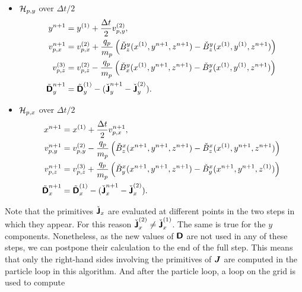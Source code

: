 \documentclass[11pt]{article}
\begin{document}
\begin{itemize}
$$\begin{aligned}
                  \tilde{\arrD}_z^{n+1} & = \tilde{\arrD}_z^n -(\check{\arrJ}_z^{(1)}-\check{\arrJ}_z^n).
              \end{aligned}
          $$
    \item $\mathcal{H}_{p,y}$ over $\Delta t/2$
          $$
              \begin{aligned}
                  y^{n+1}               & = y^{(1)} + \frac{\Delta t}{2} v_{p,y}^{(2)},                                                                        \\
                  v_{p,x}^{n+1}         & = v_{p,x}^{(2)} + \frac {q_p}{m_p} \left(\check{B}^y_z(x^{(1)},y^{n+1},z^{n+1}) - \check{B}^y_z(x^{(1)},y^{(1)},z^{n+1})\right) \\
                  v_{p,z}^{(3)}         & = v_{p,z}^{(2)} - \frac {q_p}{m_p} \left(\check{B}^y_x(x^{(1)},y^{n+1},z^{n+1}) - \check{B}^y_x(x^{(1)},y^{(1)},z^{n+1})\right) \\
                  \tilde{{\boldsymbol {\rm \mathsf{D}}}}_y^{n+1} & = \tilde{{\boldsymbol {\rm \mathsf{D}}}}_y^{(1)} -(\check{{\boldsymbol {\rm \mathsf{J}}}}_y^{n+1}-\check{{\boldsymbol {\rm \mathsf{J}}}}_y^{(2)}).
              \end{aligned}
          $$
    \item $\mathcal{H}_{p,x}$ over $\Delta t/2$
          $$
              \begin{aligned}
                  x^{n+1}               & = x^{(1)} + \frac{\Delta t}{2} v_{p,x}^{n+1},                                                                       \\
                  v_{p,y}^{n+1}         & = v_{p,y}^{(2)} - \frac {q_p}{m_p} \left(\check{B}^x_z(x^{n+1},y^{n+1},z^{n+1}) - \check{B}^x_z(x^{(1)},y^{n+1},z^{n+1})\right) \\
                  v_{p,z}^{n+1}         & = v_{p,z}^{(3)} + \frac {q_p}{m_p} \left(\check{B}^x_y(x^{n+1},y^{n+1},z^{n+1}) - \check{B}^x_y(x^{n+1},y^{n+1},z^{(1)})\right) \\
                  \tilde{{\boldsymbol {\rm \mathsf{D}}}}_x^{n+1} & = \tilde{{\boldsymbol {\rm \mathsf{D}}}}_x^{(1)} -(\check{{\boldsymbol {\rm \mathsf{J}}}}_x^{n+1}-\check{{\boldsymbol {\rm \mathsf{J}}}}_x^{(2)}).
              \end{aligned}
          $$
\end{itemize}
Note that the primitives $\check{{\boldsymbol {\rm \mathsf{J}}}}_x$ are evaluated at different points in the two steps in which they appear. For this reason $\check{{\boldsymbol {\rm \mathsf{J}}}}_x^{(2)}\neq \check{{\boldsymbol {\rm \mathsf{J}}}}_x^{(1)}$. The same is true for the $y$ components. Nonetheless, as the new values of ${\boldsymbol {\rm \mathsf{D}}}$ are not used in any of these steps, we can postpone their calculation to the end of the full step.
This means that only the right-hand sides involving the primitives of ${\boldsymbol J}$ are computed in the particle loop in this algorithm. And after the particle loop, a loop on the grid is used to compute
\end{document}
